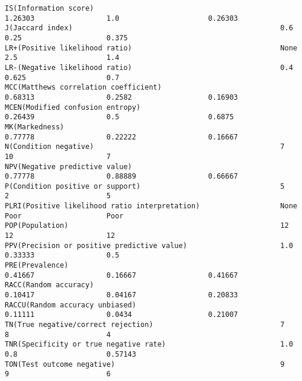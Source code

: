 \documentclass[11pt]{article}
\begin{document}
\begin{Verbatim}[commandchars=\\\{\}]
IS(Information score)                                            1.26303                 1.0                     0.26303                 
J(Jaccard index)                                                 0.6                     0.25                    0.375                   
LR+(Positive likelihood ratio)                                   None                    2.5                     1.4                     
LR-(Negative likelihood ratio)                                   0.4                     0.625                   0.7                     
MCC(Matthews correlation coefficient)                            0.68313                 0.2582                  0.16903                 
MCEN(Modified confusion entropy)                                 0.26439                 0.5                     0.6875                  
MK(Markedness)                                                   0.77778                 0.22222                 0.16667                 
N(Condition negative)                                            7                       10                      7                       
NPV(Negative predictive value)                                   0.77778                 0.88889                 0.66667                 
P(Condition positive or support)                                 5                       2                       5                       
PLRI(Positive likelihood ratio interpretation)                   None                    Poor                    Poor                    
POP(Population)                                                  12                      12                      12                      
PPV(Precision or positive predictive value)                      1.0                     0.33333                 0.5                     
PRE(Prevalence)                                                  0.41667                 0.16667                 0.41667                 
RACC(Random accuracy)                                            0.10417                 0.04167                 0.20833                 
RACCU(Random accuracy unbiased)                                  0.11111                 0.0434                  0.21007                 
TN(True negative/correct rejection)                              7                       8                       4                       
TNR(Specificity or true negative rate)                           1.0                     0.8                     0.57143                 
TON(Test outcome negative)                                       9                       9                       6                       

\end{Verbatim}
\end{document}
